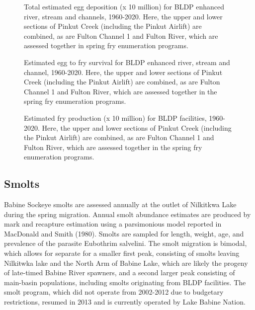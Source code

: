 \documentclass[french,11pt]{book}
\begin{document}
\begin{figure}[htb]

{\centering {} 

}

\caption{Total estimated egg deposition (x 10 million) for BLDP enhanced river, stream and channels, 1960-2020. Here, the upper and lower sections of Pinkut Creek (including the Pinkut Airlift) are combined, as are Fulton Channel 1 and Fulton River, which are assessed together in spring fry enumeration programs.}\label{fig:EggDeposition}
\end{figure}

\begin{figure}[htb]

{\centering {} 

}

\caption{Estimated egg to fry survival for BLDP enhanced river, stream and channel, 1960-2020. Here, the upper and lower sections of Pinkut Creek (including the Pinkut Airlift) are combined, as are Fulton Channel 1 and Fulton River, which are assessed together in the spring fry enumeration programs.}\label{fig:FryProd}
\end{figure}

\begin{figure}[htb]

{\centering {} 

}

\caption{Estimated fry production (x 10 million) for BLDP facilities, 1960-2020. Here, the upper and lower sections of Pinkut Creek (including the Pinkut Airlift) are combined, as are Fulton Channel 1 and Fulton River, which are assessed together in the spring fry enumeration programs.}\label{fig:EggToFry}
\end{figure}
\subsection{Smolts}\label{smolts}

Babine Sockeye smolts are assessed annually at the outlet of Nilkitkwa Lake during the spring migration. Annual smolt abundance estimates are produced by mark and recapture estimation using a parsimonious model reported in MacDonald and Smith (1980). Smolts are sampled for length, weight, age, and prevalence of the parasite Eubothrim salvelini. The smolt migration is bimodal, which allows for separate for a smaller first peak, consisting of smolts leaving Nilkitwka lake and the North Arm of Babine Lake, which are likely the progeny of late-timed Babine River spawners, and a second larger peak consisting of main-basin populations, including smolts originating from BLDP facilities. The smolt program, which did not operate from 2002-2012 due to budgetary restrictions, resumed in 2013 and is currently operated by Lake Babine Nation.
\end{document}
